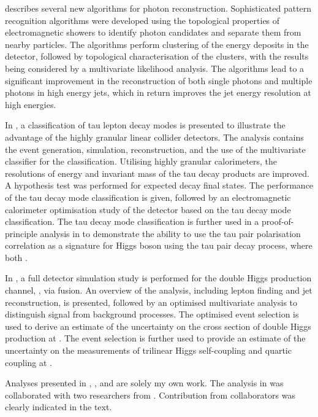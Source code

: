  describes several new \pandora algorithms for photon reconstruction. Sophisticated pattern recognition algorithms were developed using the topological properties of electromagnetic showers to identify photon candidates and separate them from nearby particles. The algorithms perform clustering of the energy deposits in the detector, followed by topological characterisation of the clusters, with the results being considered by a multivariate likelihood analysis. The algorithms lead to a significant improvement in the reconstruction of both single photons and multiple photons in high energy jets, which in return improves the jet energy resolution at high energies.



In , a classification of tau lepton decay modes is presented to illustrate the advantage of the highly granular linear collider detectors. The analysis contains the event generation, simulation, reconstruction, and the use of the multivariate classifier for the classification. Utilising highly granular calorimeters, the resolutions of energy and invariant mass of the tau decay products are improved. A hypothesis test was performed for expected decay final states.  The performance of the tau decay mode classification is given, followed by an electromagnetic calorimeter optimisation study of the \ILD detector based on the tau decay mode classification. The  tau decay mode classification is further used in a proof-of-principle analysis in  to demonstrate the ability to use the tau pair polarisation correlation as a signature for Higgs boson using the tau pair decay process, where both \tauToPionBoth.



In , a full \CLICILD detector simulation study is performed for the double Higgs production channel, \eeToHH, via \WW fusion. An overview of the analysis, including lepton finding and jet reconstruction, is presented, followed by an optimised multivariate analysis to distinguish signal from background processes. The optimised event selection is used to derive an estimate of the uncertainty on the cross section of double Higgs production at \CLIC. The event selection is further used to provide an estimate of the uncertainty on the measurements of  trilinear Higgs self-coupling and quartic coupling at \CLIC.


Analyses presented in ,  , and   are solely my own work. The analysis in   was collaborated with two researchers from \CERN. Contribution from collaborators was clearly indicated in the text.
